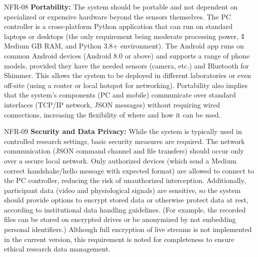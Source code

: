 \documentclass[11pt,a4paper]{report}
\begin{document}
  NFR-08                  \textbf{Portability:} The system should be portable and not dependent on specialized or expensive hardware beyond the sensors themselves. The PC controller is a cross-platform Python application that can run on standard laptops or desktops (the only requirement being moderate processing power, \~4 Medium
                          GB RAM, and Python 3.8+ environment). The Android app runs on common Android devices (Android 8.0 or above) and supports a range of phone models, provided they have the needed sensors (camera, etc.) and Bluetooth for Shimmer. This allows the system to be deployed in different laboratories or  
                          even off-site (using a router or local hotspot for networking). Portability also implies that the system's components (PC and mobile) communicate over standard interfaces (TCP/IP network, JSON messages) without requiring wired connections, increasing the flexibility of where and how it can be 
                          used.                                                                                                                                                                                                                                                                                                 

  NFR-09                  \textbf{Security and Data Privacy:} While the system is typically used in controlled research settings, basic security measures are required. The network communication (JSON command channel and file transfers) should occur only over a secure local network. Only authorized devices (which send a     Medium
                          correct handshake/hello message with expected format) are allowed to connect to the PC controller, reducing the risk of unauthorized interception. Additionally, participant data (video and physiological signals) are sensitive, so the system should provide options to encrypt stored data or     
                          otherwise protect data at rest, according to institutional data handling guidelines. (For example, the recorded files can be stored on encrypted drives or be anonymized by not embedding personal identifiers.) Although full encryption of live streams is not implemented in the current version,  
                          this requirement is noted for completeness to ensure ethical research data management.                                                                                                                                                                                                                
\end{document}
